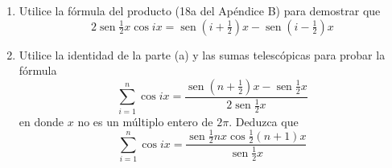 \item 
\begin{enumerate}
    \item[(a)] Utilice la fórmula del producto (18a del Apéndice B) para demostrar que
    $$2 \operatorname{sen} \tfrac{1}{2}x \cos ix = \operatorname{sen}(i + \tfrac{1}{2})x - \operatorname{sen}(i - \tfrac{1}{2})x$$
    \item[(b)] Utilice la identidad de la parte (a) y las sumas telescópicas para probar la fórmula
    $$\sum_{i=1}^n \cos ix = \frac{\operatorname{sen}(n + \frac{1}{2})x - \operatorname{sen} \frac{1}{2}x}{2 \operatorname{sen} \frac{1}{2}x}$$
    en donde $x$ no es un múltiplo entero de $2\pi$. Deduzca que
    $$\sum_{i=1}^n \cos ix = \frac{\operatorname{sen} \frac{1}{2}nx \cos \frac{1}{2}(n + 1)x}{\operatorname{sen} \frac{1}{2}x}$$
\end{enumerate}
